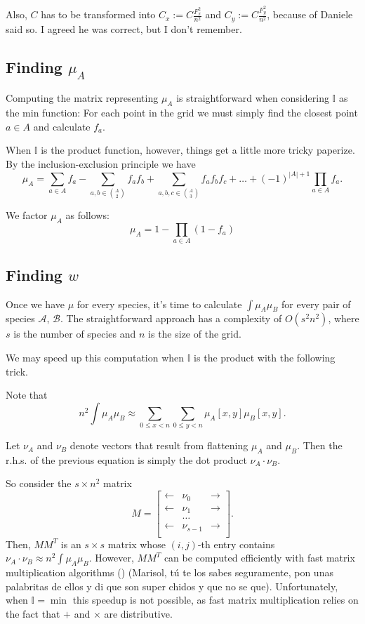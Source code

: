 \documentclass[12pt]{article}
\numberwithin{equation}{section} %
\numberwithin{figure}{section} %
\def\cA{{\mathcal{A}}}
\def\cB{{\mathcal{B}}}
\def\II{{\mathbb{I}}}
\theoremstyle{definition}
\def\tcr#1{\textcolor{MyRed}{#1}}
\begin{document}
	Also, $C$ has to be transformed into $C_x := C\frac{F_x^2}{n^2}$ and $C_y :=  C\frac{F_y^2}{n^2}$, because of \tcr{Daniele said so. I agreed he was correct, but I don't remember.}

\subsection{Finding \texorpdfstring{$\mu_A$}{mu\_A}}
Computing the matrix representing $\mu_A$ is straightforward when considering $\II$ as the min function: For each point in the grid we must simply find the closest point $a\in A$ and calculate $f_a$.

When $\II$ is the product function, however, things get a little more tricky \tcr{paperize}. By the inclusion-exclusion principle we have
	$$\mu_A = \sum_{a\in A} f_{a} - \sum_{a,b \in \binom{A}{2}} f_a f_b + \sum_{a,b,c \in \binom{A}{3} } f_a f_{b} f_{c} + \dots + (-1)^{|A|+1} \prod_{a\in A} f_a.$$

	We factor $\mu_A$ as follows:
$$\mu_A = 1-\prod_{a\in A} (1-f_a)$$

	

	\subsection{Finding \texorpdfstring{$w$}{w}}
	
	Once we have $\mu$ for every species, it's time to calculate $\int \mu_A\mu_B$ for every pair of species $\cA$, $\cB$. The straightforward approach has a complexity of $O(s^2n^2)$, where $s$ is the number of species and $n$ is the size of the grid.
	
	We may speed up this computation when $\II$ is the product with the following trick. 
	
	Note that 
		$$n^2\int \mu_A \mu_B \approx \sum_{0\leq x < n} \sum_{0\leq y < n} \mu_A[x,y]\mu_B[x,y].$$
	
	Let $\nu_A$ and $\nu_B$ denote vectors that result from flattening $\mu_A$ and $\mu_B$. Then the r.h.s. of the previous equation is simply the dot product $\nu_A\cdot \nu_B$.
	
	So consider the $s\times n^2$ matrix 
	$$M = \begin{bmatrix}
	        \longleftarrow & \nu_0 & \longrightarrow \\
	        \longleftarrow & \nu_1 & \longrightarrow \\
	          & \dots &   \\
					\longleftarrow & \nu_{s-1} & \longrightarrow \\
	      \end{bmatrix}.
	$$
Then, $MM^T$ is an $s\times s$ matrix whose $(i,j)$-th entry contains $\nu_A\cdot \nu_B \approx n^2\int \mu_A \mu_B$. However, $MM^T$ can be computed efficiently with fast matrix multiplication algorithms (\cite{strassen}) \tcr{(Marisol, tú te los sabes seguramente, pon unas palabritas de ellos y di que son super chidos y que no se que)}. Unfortunately, when $\II = \min$ this speedup is not possible, as fast matrix multiplication relies on the fact that $+$ and $\times$ are distributive.
\end{document}
